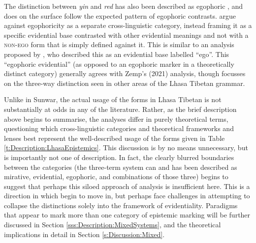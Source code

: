 The distinction between \textit{yin} and \textit{red} has also been described as egophoric \cite{EgoIntro}, and does on the surface follow the expected pattern of egophoric contrasts.  argue against egophoricity as a separate cross-linguistic category, instead framing it as a specific evidential base contrasted with other evidential meanings and not with a \textsc{non-ego} form that is simply defined against it. This is similar to an analysis proposed by , who described this as an evidential base labelled ``ego''. This ``egophoric evidential'' (as opposed to an egophoric marker in a theoretically distinct category) generally agrees with Zemp's (2021) analysis, though focusses on the three-way distinction seen in other areas of the Lhasa Tibetan grammar. 

Unlike in Sunwar, the actual usage of the forms in Lhasa Tibetan is not substantially at odds in any of the literature. Rather, as the brief description above begins to summarise, the analyses differ in purely theoretical terms, questioning which cross-linguistic categories and theoretical frameworks and lenses best represent the well-described usage of the forms given in Table \ref{t:Description:LhasaEpistemics}. This discussion is by no means unnecessary, but is importantly not one of description. In fact, the clearly blurred boundaries between the categories (the three-term system can and has been described as mirative, evidential, egophoric, and combinations of those three) begins to suggest that perhaps this siloed approach of analysis is insufficient here. This is a direction in which  begin to move in, but perhaps face challenges in attempting to collapse the distinctions solely into the framework of evidentiality. Paradigms that appear to mark more than one category of epistemic marking will be further discussed in Section \ref{sss:Description:MixedSystems}, and the theoretical implications in detail in Section \ref{s:Discussion:Mixed}.